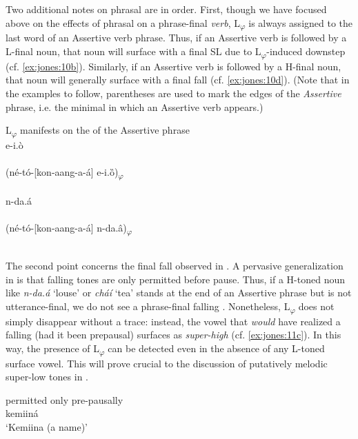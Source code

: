 \documentclass[output=paper,newtxmath,modfonts,nonflat,hidelinks]{langsci/langscibook}
\begin{document}
Two additional notes on phrasal  are in order. First, though we have focused above on the effects of phrasal  on a phrase-final \textit{verb}, L\textsubscript{$\varphi $} is always assigned to the last word of an Assertive verb phrase. Thus, if an Assertive verb is followed by a L-final noun, that noun will surface with a final SL  due to L\textsubscript{$\varphi $}-induced downstep (cf. \ref{ex:jones:10b}). Similarly, if an Assertive verb is followed by a H-final noun, that noun will generally surface with a final fall (cf. \ref{ex:jones:10d}). (Note that in the examples to follow, parentheses are used to mark the edges of the \textit{Assertive} phrase, i.e. the minimal  in which an Assertive verb appears.)

\largerpage
\ea\label{ex:jones:10}
{L\textsubscript{$\varphi $} manifests on the  of the Assertive phrase}\\
\ea\label{ex:jones:10a}
{e-i.ò} \\
\\
\ex\label{ex:jones:10b}
{(né-tó-[kon-aang-a-á] e-i.ȍ)\textsubscript{$\varphi $}} \\
\\
\ex\label{ex:jones:10c}
{n-da.á} \\
\\
\ex\label{ex:jones:10d}
{(né-tó-[kon-aang-a-á] n-da.â)\textsubscript{$\varphi $}} \\
\\
\z
\z

The second point concerns the final fall observed in . A pervasive generalization in  is that falling tones are only permitted before pause. Thus, if a H-toned noun like \textit{n-da.á} ‘louse’ or \textit{cháí} ‘tea’ stands at the end of an Assertive phrase but is not utterance-final, we do not see a phrase-final falling . Nonetheless, L\textsubscript{$\varphi $} does not simply disappear without a trace: instead, the vowel that \textit{would} have realized a falling  (had it been prepausal) surfaces as \textit{super-high} (cf. \ref{ex:jones:11c}). In this way, the presence of L\textsubscript{$\varphi $} can be detected even in the absence of any L-toned surface vowel. This will prove crucial to the discussion of putatively melodic super-low tones in .
 
\ea\label{ex:jones:11}
 permitted only pre-pausally \citep[252]{Roberts-Kohno2000}\\
\ea\label{ex:jones:11a}
{kemiiná} \\
\glt   ‘Kemiina (a name)’
\end{document}
